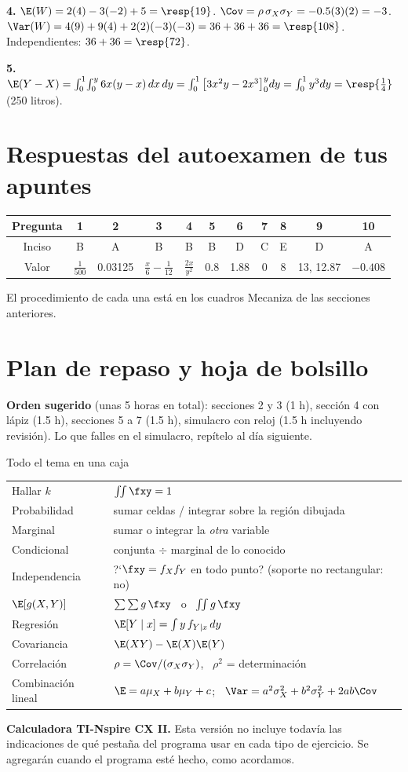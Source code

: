 \textbf{4.} $\E(W)=2(4)-3(-2)+5=\resp{19}$. $\Cov=\rho\,\sigma_X\sigma_Y=-0.5(3)(2)=-3$.
$\Var(W)=4(9)+9(4)+2(2)(-3)(-3)=36+36+36=\resp{108}$. Independientes: $36+36=\resp{72}$.

\textbf{5.} $\E(Y-X)=\int_0^1\!\int_0^y6x(y-x)\,dx\,dy=\int_0^1\big[3x^2y-2x^3\big]_0^ydy=\int_0^1y^3dy=\resp{\tfrac14}$ (250 litros).

\section{Respuestas del autoexamen de tus apuntes}

\begin{center}
\begin{tabular}{c|cccccccccc}
Pregunta & 1 & 2 & 3 & 4 & 5 & 6 & 7 & 8 & 9 & 10\\ \hline
Inciso & B & A & B & B & B & D & C & E & D & A\\
Valor & $\tfrac1{500}$ & 0.03125 & $\tfrac x6-\tfrac1{12}$ & $\tfrac{2x}{y^2}$ & 0.8 & 1.88 & 0 & 8 & 13, 12.87 & $-0.408$
\end{tabular}
\end{center}
El procedimiento de cada una est\'a en los cuadros \guillemotleft Mecaniza\guillemotright{} de las secciones anteriores.

\section{Plan de repaso y hoja de bolsillo}

\textbf{Orden sugerido} (unas 5 horas en total): secciones 2 y 3 (1 h), secci\'on 4 con l\'apiz (1.5 h),
secciones 5 a 7 (1.5 h), simulacro con reloj (1.5 h incluyendo revisi\'on). Lo que falles en el simulacro, rep\'itelo al d\'ia siguiente.

\begin{teoria}{Todo el tema en una caja}
\begin{center}
\begin{tabular}{ll}
Hallar $k$ & $\iint\fxy=1$\\
Probabilidad & sumar celdas / integrar sobre la regi\'on dibujada\\
Marginal & sumar o integrar la \emph{otra} variable\\
Condicional & conjunta $\div$ marginal de lo conocido\\
Independencia & ?`$\fxy=f_Xf_Y$ en todo punto? (soporte no rectangular: no)\\
$\E[g(X,Y)]$ & $\sum\sum g\,\fxy$ \ o \ $\iint g\,\fxy$\\
Regresi\'on & $\E[Y\mid x]=\int y\,f_{Y\mid x}\,dy$\\
Covariancia & $\E(XY)-\E(X)\E(Y)$\\
Correlaci\'on & $\rho=\Cov/(\sigma_X\sigma_Y)$, \ $\rho^2$ = determinaci\'on\\
Combinaci\'on lineal & $\E=a\mu_X+b\mu_Y+c$; \ $\Var=a^2\sigma_X^2+b^2\sigma_Y^2+2ab\Cov$
\end{tabular}
\end{center}
\end{teoria}

\textbf{Calculadora TI-Nspire CX II.} Esta versi\'on no incluye todav\'ia las indicaciones de qu\'e pesta\~na del programa usar en cada
tipo de ejercicio. Se agregar\'an cuando el programa est\'e hecho, como acordamos.
